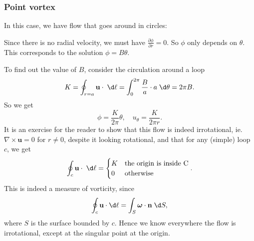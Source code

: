 \documentclass[a4paper]{article}
\begin{document}
\subsubsection{Point vortex}
In this case, we have flow that goes around in circles:
\begin{center}
\end{center}
Since there is no radial velocity, we must have $\frac{\partial \phi}{\partial r} = 0$. So $\phi$ only depends on $\theta$. This corresponds to the solution $\phi = B\theta$.

To find out the value of $B$, consider the circulation around a loop
\[
  K = \oint_{r = a} \mathbf{u}\cdot \;\d \ell = \int_0^{2\pi} \frac{B}{a} \cdot a \;\d \theta = 2\pi B.
\]
So we get
\[
  \phi = \frac{K}{2\pi}\theta,\quad u_\theta = \frac{K}{2\pi r}.
\]
It is an exercise for the reader to show that this flow is indeed irrotational, ie. $\nabla \times \mathbf{u} = 0$ for $r \not= 0$, despite it looking rotational, and that for any (simple) loop $c$, we get
\[
  \oint_c \mathbf{u}\cdot\;\d \ell =
  \begin{cases}
    K & \text{the origin is inside C}\\
    0 & \text{otherwise}
  \end{cases}.
\]
This is indeed a measure of vorticity, since
\[
  \oint_c \mathbf{u}\cdot \d \ell = \int_S \boldsymbol\omega \cdot \mathbf{n} \;\d S,
\]
where $S$ is the surface bounded by $c$. Hence we know everywhere the flow is irrotational, except at the singular point at the origin.
\end{document}
